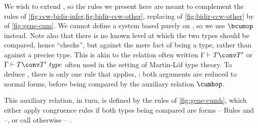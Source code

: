 We wish to extend , so the rules we present here are meant to complement
the rules of \cref{fig:ccw-bidir-infer,fig:bidir-ccw-other}, replacing 
of \cref{fig:bidir-ccw-other} by  of \cref{fig:gene-cum}.
We cannot define a system based purely on ,%
so we use  $\mathord{\bcumop}$ instead.
Note also that there is no known level at which the two types should be compared,
hence  “checks”, but against the mere
fact of being a type, rather than against a precise type. This is akin to the relation often
written $\Gamma \vdash T \conv T'$ or $\Gamma \vdash T \conv T'\ type$ often used in the
setting of Martin-Löf type theory.
To deduce ,
there is only one rule that applies, :
both arguments are reduced to  normal forms, before being compared
by the auxiliary relation $\cumhop$.

\begin{figure*}[h]
  \ContinuedFloat
  \caption{ between reduced types}
  \label{fig:gene-cumh}
\end{figure*}

This auxiliary relation, in turn, is defined by the rules of \cref{fig:gene-cumh}, which
either apply congruence rules if both types being compared are  forms –
Rules  and  –, or call
 otherwise – .

\begin{figure*}[h]
  \ContinuedFloat
  \caption{ between types}
  \label{fig:gene-conv-ty}
\end{figure*}

